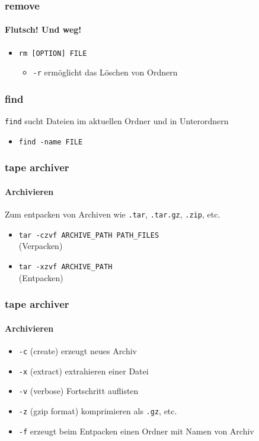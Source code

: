 \documentclass[12pt,utf8]{beamer}
\begin{document}
\begin{frame}
\frametitle{\textcolor{FOSSAGalert}{r}e\textcolor{FOSSAGalert}{m}ove}
\framesubtitle{Flutsch! Und weg!}
\begin{itemize}
	\item \texttt{rm [OPTION] FILE}
	\begin{itemize}[<+->]
		\item \texttt{-r} ermöglicht das Löschen von Ordnern
	\end{itemize}
\end{itemize}
\end{frame}

\begin{frame}
	\frametitle{find}
	\texttt{find} sucht Dateien im aktuellen Ordner und in Unterordnern
	\begin{itemize}
		\item \texttt{find -name FILE}
	\end{itemize}
\end{frame}

\begin{frame}
\frametitle{\textcolor{FOSSAGalert}{t}ape \textcolor{FOSSAGalert}{ar}chiver}
\framesubtitle{Archivieren}
Zum entpacken von Archiven wie \texttt{.tar}, \texttt{.tar.gz}, \texttt{.zip}, etc. 
\begin{itemize}
	\item \texttt{tar -czvf ARCHIVE\_PATH PATH\_FILES}\\(Verpacken)
	\item \texttt{tar -xzvf ARCHIVE\_PATH}\\(Entpacken)
\end{itemize}
\end{frame}

\begin{frame}
\frametitle{\textcolor{FOSSAGalert}{t}ape \textcolor{FOSSAGalert}{ar}chiver}
\framesubtitle{Archivieren}
\begin{itemize}[<+->]
	\item {\scriptsize \texttt{-c} (create) erzeugt neues Archiv}
	\item {\scriptsize \texttt{-x} (extract) extrahieren einer Datei}
	\item {\scriptsize \texttt{-v} (verbose) Fortschritt auflisten}
	\item {\scriptsize \texttt{-z} (gzip format) komprimieren als \texttt{.gz}, etc.}
	\item {\scriptsize \texttt{-f} erzeugt beim Entpacken einen Ordner mit Namen von Archiv}
\end{itemize}
\end{frame}
\end{document}
